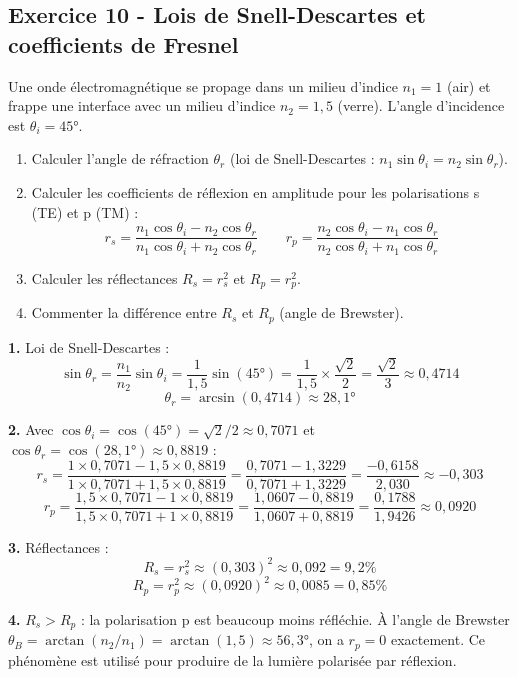 \documentclass[12pt,a4paper]{article}
\begin{document}
\subsection*{Exercice 10 - Lois de Snell-Descartes et coefficients de Fresnel \niveau{\difficile}}

\begin{boiteexercice}
Une onde électromagnétique se propage dans un milieu d'indice $n_1 = 1$ (air) et frappe une interface avec un milieu d'indice $n_2 = 1{,}5$ (verre). L'angle d'incidence est $\theta_i = 45°$.
\begin{enumerate}
  \item Calculer l'angle de réfraction $\theta_r$ (loi de Snell-Descartes : $n_1\sin\theta_i = n_2\sin\theta_r$).
  \item Calculer les coefficients de réflexion en amplitude pour les polarisations s (TE) et p (TM) :
  \[
  r_s = \frac{n_1\cos\theta_i - n_2\cos\theta_r}{n_1\cos\theta_i + n_2\cos\theta_r} \qquad r_p = \frac{n_2\cos\theta_i - n_1\cos\theta_r}{n_2\cos\theta_i + n_1\cos\theta_r}
  \]
  \item Calculer les réflectances $R_s = r_s^2$ et $R_p = r_p^2$.
  \item Commenter la différence entre $R_s$ et $R_p$ (angle de Brewster).
\end{enumerate}
\end{boiteexercice}

\begin{boitecorrige}
\textbf{1.} Loi de Snell-Descartes :
\[
\sin\theta_r = \frac{n_1}{n_2}\sin\theta_i = \frac{1}{1{,}5}\sin(45°) = \frac{1}{1{,}5}\times\frac{\sqrt{2}}{2} = \frac{\sqrt{2}}{3} \approx 0{,}4714
\]
\[
\theta_r = \arcsin(0{,}4714) \approx 28{,}1°
\]

\textbf{2.} Avec $\cos\theta_i = \cos(45°) = \sqrt{2}/2 \approx 0{,}7071$ et $\cos\theta_r = \cos(28{,}1°) \approx 0{,}8819$ :
\[
r_s = \frac{1\times0{,}7071 - 1{,}5\times0{,}8819}{1\times0{,}7071 + 1{,}5\times0{,}8819} = \frac{0{,}7071 - 1{,}3229}{0{,}7071 + 1{,}3229} = \frac{-0{,}6158}{2{,}030} \approx -0{,}303
\]
\[
r_p = \frac{1{,}5\times0{,}7071 - 1\times0{,}8819}{1{,}5\times0{,}7071 + 1\times0{,}8819} = \frac{1{,}0607 - 0{,}8819}{1{,}0607 + 0{,}8819} = \frac{0{,}1788}{1{,}9426} \approx 0{,}0920
\]

\textbf{3.} Réflectances :
\[
R_s = r_s^2 \approx (0{,}303)^2 \approx 0{,}092 = 9{,}2\%
\]
\[
R_p = r_p^2 \approx (0{,}0920)^2 \approx 0{,}0085 = 0{,}85\%
\]

\textbf{4.} $R_s > R_p$ : la polarisation p est beaucoup moins réfléchie. À l'angle de Brewster $\theta_B = \arctan(n_2/n_1) = \arctan(1{,}5) \approx 56{,}3°$, on a $r_p = 0$ exactement. Ce phénomène est utilisé pour produire de la lumière polarisée par réflexion.
\end{boitecorrige}

\ifdefined\inMainDoc\else
\end{document}
